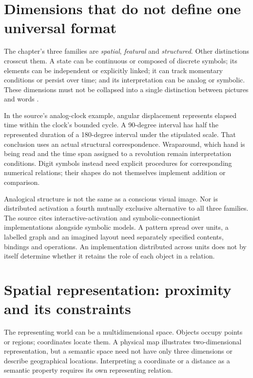 \section{Dimensions that do not define one universal format}
\label{sec:p19-ckr-dimensions}

The chapter's three families are \emph{spatial}, \emph{featural}
and \emph{structured}. Other distinctions crosscut them. A state
can be continuous or composed of discrete symbols; its elements
can be independent or explicitly linked; it can track momentary
conditions or persist over time; and its interpretation can be
analog or symbolic. These dimensions must not be collapsed into
a single distinction between pictures and words
\cite[p.~39]{Markman2012CognitiveRepresentation}.

In the source's analog-clock example, angular displacement represents
elapsed time within the clock's bounded cycle. A 90-degree interval
has half the represented duration of a 180-degree interval under
the stipulated scale. That conclusion uses an actual structural
correspondence. Wraparound, which hand is being read and the time
span assigned to a revolution remain interpretation conditions.
Digit symbols instead need explicit procedures for corresponding
numerical relations; their shapes do not themselves implement
addition or comparison.

Analogical structure is not the same as a conscious visual image.
Nor is distributed activation a fourth mutually exclusive alternative
to all three families. The source cites interactive-activation and
symbolic-connectionist implementations alongside symbolic models.
A pattern spread over units, a labelled graph and an imagined
layout need separately specified contents, bindings and operations.
An implementation distributed across units does not by itself
determine whether it retains the role of each object in a relation.

\section{Spatial representation: proximity and its constraints}
\label{sec:p19-ckr-spatial}

The representing world can be a multidimensional space. Objects
occupy points or regions; coordinates locate them. A physical map
illustrates two-dimensional representation, but a semantic space
need not have only three dimensions or describe geographical
locations. Interpreting a coordinate or a distance as a semantic
property requires its own representing relation.

